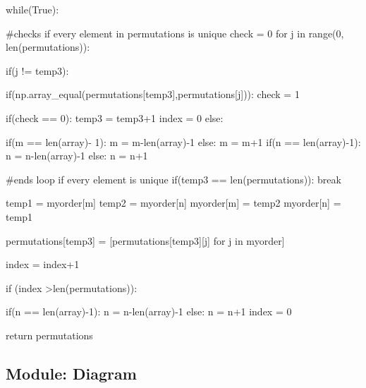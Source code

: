 \documentclass[11pt,a4paper,notitlepage]{article}
\begin{document}
\begin{code}
        while(True): 
                   
            #checks if every element in permutations is unique 
            check = 0                
            for j in range(0, len(permutations)): 
                      
                if(j != temp3): 
                          
                    if(np.array_equal(permutations[temp3],permutations[j])): 
                        check = 1
              
            if(check == 0): 
                temp3 = temp3+1
                index = 0
            else: 
                  
                if(m == len(array)- 1): 
                    m = m-len(array)-1
                else: 
                    m = m+1
                if(n == len(array)-1): 
                    n = n-len(array)-1
                else: 
                    n = n+1
              
            #ends loop if every element is unique 
            if(temp3 == len(permutations)): 
                break
                  
            temp1 = myorder[m] 
            temp2 = myorder[n] 
            myorder[m] = temp2 
            myorder[n] = temp1 
              
            permutations[temp3] = [permutations[temp3][j] for j in myorder] 
            
            index = index+1
            
            if (index >len(permutations)):
                
                if(n == len(array)-1): 
                    n = n-len(array)-1
                else: 
                    n = n+1
                index = 0
                  
      
    return permutations 
  
\end{code}

\subsection{Module: Diagram}
\end{document}
